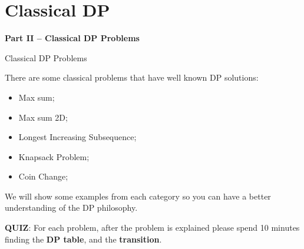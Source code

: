 




\section{Classical DP}

\begin{frame}
  \begin{center}
    {\bf Part II -- Classical DP Problems}
  \end{center}
\end{frame}

\begin{frame}{Classical DP Problems}

  There are some classical problems that have well known DP solutions:
  \bigskip

  \begin{itemize}
    \item Max sum;
    \item Max sum 2D;
    \item Longest Increasing Subsequence;
    \item Knapsack Problem;
    \item Coin Change;
  \end{itemize}
  \bigskip

  We will show some examples from each category so you can have a better understanding of the DP philosophy.\bigskip

  {\bf QUIZ}: For each problem, after the problem is explained please spend 10 minutes finding the {\bf DP table}, and the {\bf transition}.
\end{frame}

